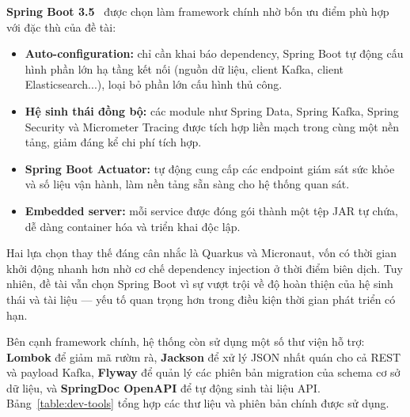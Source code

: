 \documentclass[../DoAn.tex]{subfiles}
\begin{document}
\textbf{Spring Boot 3.5}~\cite{springboot_docs} được chọn làm framework chính nhờ bốn ưu
điểm phù hợp với đặc thù của đề tài:

\begin{itemize}[noitemsep]
    \item \textbf{Auto-configuration:} chỉ cần khai báo dependency, Spring Boot tự động cấu
          hình phần lớn hạ tầng kết nối (nguồn dữ liệu, client Kafka, client Elasticsearch...),
          loại bỏ phần lớn cấu hình thủ công.
    \item \textbf{Hệ sinh thái đồng bộ:} các module như Spring Data, Spring Kafka, Spring
          Security và Micrometer Tracing được tích hợp liền mạch trong cùng một nền tảng,
          giảm đáng kể chi phí tích hợp.
    \item \textbf{Spring Boot Actuator:} tự động cung cấp các endpoint giám sát sức khỏe và
          số liệu vận hành, làm nền tảng sẵn sàng cho hệ thống quan sát.
    \item \textbf{Embedded server:} mỗi service được đóng gói thành một tệp JAR tự chứa, dễ
          dàng container hóa và triển khai độc lập.
\end{itemize}

Hai lựa chọn thay thế đáng cân nhắc là Quarkus và Micronaut, vốn có thời gian khởi động nhanh
hơn nhờ cơ chế dependency injection ở thời điểm biên dịch. Tuy nhiên, đề tài vẫn chọn Spring
Boot vì sự vượt trội về độ hoàn thiện của hệ sinh thái và tài liệu --- yếu tố quan trọng hơn
trong điều kiện thời gian phát triển có hạn.

Bên cạnh framework chính, hệ thống còn sử dụng một số thư viện hỗ trợ: \textbf{Lombok} để
giảm mã rườm rà, \textbf{Jackson} để xử lý JSON nhất quán cho cả REST và payload Kafka,
\textbf{Flyway} để quản lý các phiên bản migration của schema cơ sở dữ liệu, và
\textbf{SpringDoc OpenAPI} để tự động sinh tài liệu API. Bảng~\ref{table:dev-tools} tổng hợp
các thư liệu và phiên bản chính được sử dụng.
\end{document}

